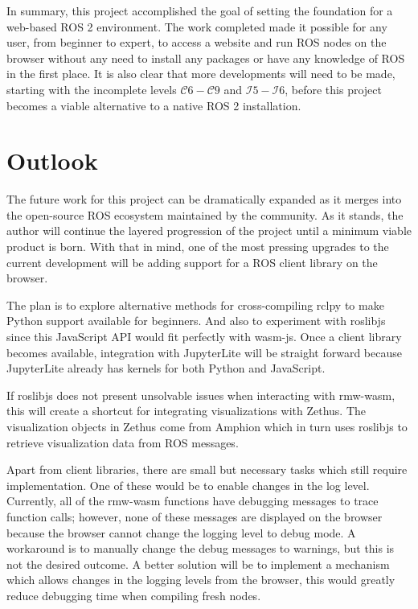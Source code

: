 In summary, this project accomplished the goal of setting the foundation for a web-based \ac{ROS} 2 environment. The work completed made it possible for any user, from beginner to expert, to access a website and run \ac{ROS} nodes on the browser without any need to install any packages or have any knowledge of \ac{ROS} in the first place. It is also clear that more developments will need to be made, starting with the incomplete levels $\mathcal{C}6-\mathcal{C}9$ and $\mathcal{I}5-\mathcal{I}6$, before this project becomes a viable alternative to a native \ac{ROS} 2 installation.


\section{Outlook}

The future work for this project can be dramatically expanded as it merges into the open-source \ac{ROS} ecosystem maintained by the community. As it stands, the author will continue the layered progression of the project until a minimum viable product is born. With that in mind, one of the most pressing upgrades to the current development will be adding support for a \ac{ROS} client library on the browser. 

The plan is to explore alternative methods for cross-compiling \textsf{rclpy} to make Python support available for beginners. And also to experiment with \textsf{roslibjs} since this JavaScript \ac{API} would fit perfectly with \textsf{wasm-js}. Once a client library becomes available, integration with JupyterLite will be straight forward because JupyterLite already has kernels for both Python and JavaScript.

If \textsf{roslibjs} does not present unsolvable issues when interacting with \textsf{rmw-wasm}, this will create a shortcut for integrating visualizations with Zethus. The visualization objects in Zethus come from Amphion which in turn uses \textsf{roslibjs} to retrieve visualization data from \ac{ROS} messages. 

Apart from client libraries, there are small but necessary tasks which still require implementation. One of these would be to enable changes in the log level. Currently, all of the \textsf{rmw-wasm} functions have debugging messages to trace function calls; however, none of these messages are displayed on the browser because the browser cannot change the logging level to debug mode. A workaround is to manually change the debug messages to warnings, but this is not the desired outcome. A better solution will be to implement a mechanism which allows changes in the logging levels from the browser, this would greatly reduce debugging time when compiling fresh nodes.

